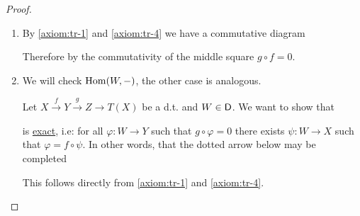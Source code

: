\documentclass[../../main]{subfiles}
\begin{document}
\begin{proof}~
\begin{enumerate}
  \item By \ref{axiom:tr-1} and \ref{axiom:tr-4} we have a commutative diagram
        \begin{center}
        \end{center}
        Therefore by the commutativity of the middle square \(g \circ f = 0\).
  \item We will check \(\operatorname{Hom}(W, -)\), the other case is analogous.

        Let \(X \xrightarrow{f} Y \xrightarrow{g} Z \to T(X)\) be a d.t. and \(W \in \mathsf{D}\).
        We want to show that
        \begin{center}
        \end{center}
        is \hyperref[def:exact-sequence]{exact}, i.e: for all \(\varphi: W \to Y\) such that \(g \circ \varphi = 0\) there exists \(\psi: W \to X\) such that \(\varphi = f \circ \psi\).
        In other words, that the dotted arrow below may be completed
        \begin{center}
        \end{center}
        This follows directly from \ref{axiom:tr-1} and \ref{axiom:tr-4}.
\end{enumerate}
\end{proof}
\end{document}
